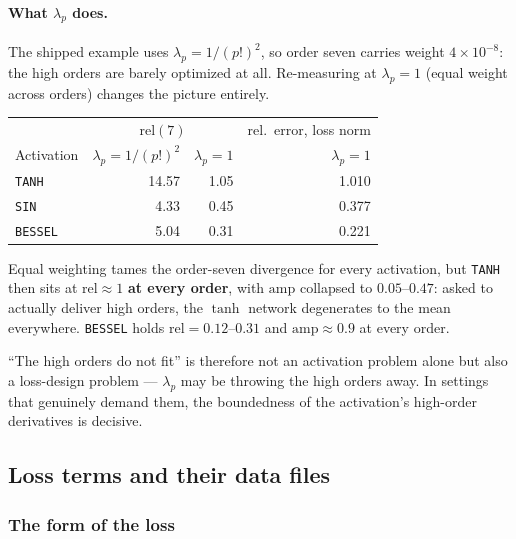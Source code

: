 \documentclass[10pt,a4paper]{article}
\newcommand{\code}[1]{\texttt{#1}}
\begin{document}
\paragraph{What $\lambda_p$ does.}
The shipped example uses $\lambda_p=1/(p!)^2$, so order seven carries
weight $4\times10^{-8}$: the high orders are barely optimized at all.
Re-measuring at $\lambda_p=1$ (equal weight across orders) changes the
picture entirely.

\begin{center}
\begin{tabular}{@{}lrrr@{}}
\toprule
 & \multicolumn{2}{c}{$\mathrm{rel}(7)$} & rel.\ error, loss norm \\
Activation & $\lambda_p=1/(p!)^2$ & $\lambda_p=1$ & $\lambda_p=1$ \\
\midrule
\code{TANH}   & 14.57 & 1.05 & 1.010 \\
\code{SIN}    &  4.33 & 0.45 & 0.377 \\
\code{BESSEL} &  5.04 & 0.31 & 0.221 \\
\bottomrule
\end{tabular}
\end{center}

Equal weighting tames the order-seven divergence for every
activation, but \code{TANH} then sits at $\mathrm{rel}\approx1$
\textbf{at every order}, with $\mathrm{amp}$ collapsed to
$0.05$--$0.47$: asked to actually deliver high orders, the $\tanh$
network degenerates to the mean everywhere. \code{BESSEL} holds
$\mathrm{rel}=0.12$--$0.31$ and $\mathrm{amp}\approx0.9$ at every
order.

``The high orders do not fit'' is therefore not an activation problem
alone but also a loss-design problem --- $\lambda_p$ may be throwing
the high orders away. In settings that genuinely demand them, the
boundedness of the activation's high-order derivatives is decisive.

\subsection{Loss terms and their data files}

\subsubsection{The form of the loss}
\end{document}
